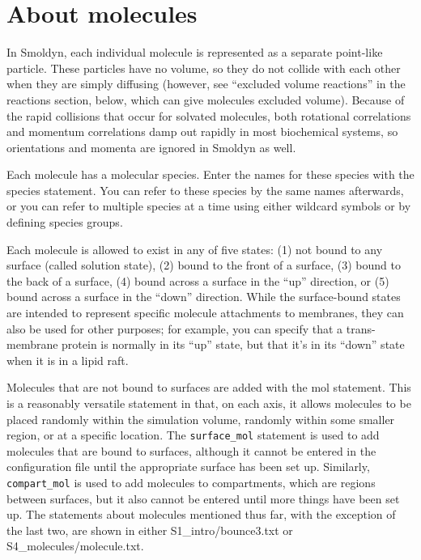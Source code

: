 \documentclass {scrbook}
\newcommand {\ttt} {\texttt}
\begin{document}
\section{About molecules}

In Smoldyn, each individual molecule is represented as a separate point-like particle. These particles have no volume, so they do not collide with each other when they are simply diffusing (however, see ``excluded volume reactions'' in the reactions section, below, which can give molecules excluded volume). Because of the rapid collisions that occur for solvated molecules, both rotational correlations and momentum correlations damp out rapidly in most biochemical systems, so orientations and momenta are ignored in Smoldyn as well.

Each molecule has a molecular species. Enter the names for these species with the species statement. You can refer to these species by the same names afterwards, or you can refer to multiple species at a time using either wildcard symbols or by defining species groups.

Each molecule is allowed to exist in any of five states: (1) not bound to any surface (called solution state), (2) bound to the front of a surface, (3) bound to the back of a surface, (4) bound across a surface in the ``up'' direction, or (5) bound across a surface in the ``down'' direction. While the surface-bound states are intended to represent specific molecule attachments to membranes, they can also be used for other purposes; for example, you can specify that a trans-membrane protein is normally in its ``up'' state, but that it's in its ``down'' state when it is in a lipid raft.

Molecules that are not bound to surfaces are added with the mol statement. This is a reasonably versatile statement in that, on each axis, it allows molecules to be placed randomly within the simulation volume, randomly within some smaller region, or at a specific location. The \ttt{surface\_mol} statement is used to add molecules that are bound to surfaces, although it cannot be entered in the configuration file until the appropriate surface has been set up. Similarly, \ttt{compart\_mol} is used to add molecules to compartments, which are regions between surfaces, but it also cannot be entered until more things have been set up. The statements about molecules mentioned thus far, with the exception of the last two, are shown in either S1\_intro/bounce3.txt or S4\_molecules/molecule.txt.
\end{document}
